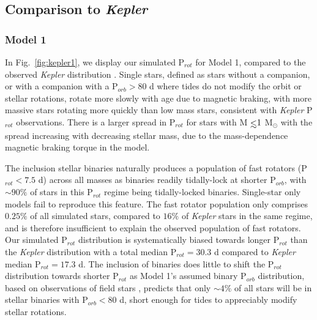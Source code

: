 \documentclass[twocolumn]{aastex61}
\def\lsim{~\rlap{$<$}{\lower 1.0ex\hbox{$\sim$}}}
\begin{document}
\subsection{Comparison to \textit{Kepler}}

\subsubsection{Model 1} \label{sec:results:kepler1}

In Fig.~\ref{fig:kepler1}, we display our simulated P$_{rot}$ for Model 1, compared to the observed \textit{Kepler} distribution \citep{McQuillan2014}. Single stars, defined as stars without a companion, or with a companion with a P$_{orb} > 80$ d where tides do not modify the orbit or stellar rotations, rotate more slowly with age due to magnetic braking, with more massive stars rotating more quickly than low mass stars, consistent with \textit{Kepler} P$_{rot}$ observations.  There is a larger spread in P$_{rot}$ for stars with M$\lsim 1$ M$_{\odot}$ with the spread increasing with decreasing stellar mass, due to the mass-dependence magnetic braking torque in the \citet{Matt2015} model.

The inclusion stellar binaries naturally produces a population of fast rotators (P$_{rot} < 7.5$ d) across all masses as binaries readily tidally-lock at shorter P$_{orb}$, with ${\sim}90\%$ of stars in this P$_{rot}$ regime being tidally-locked binaries. Single-star only models fail to reproduce this feature.  The fast rotator population only comprises $0.25\%$ of all simulated stars, compared to $16\%$ of \textit{Kepler} stars in the same regime, and is therefore insufficient to explain the observed population of fast rotators. Our simulated P$_{rot}$ distribution is systematically biased towards longer P$_{rot}$ than the \textit{Kepler} distribution with a total median P$_{rot} = 30.3$ d compared to \textit{Kepler} median P$_{rot} = 17.3$ d. The inclusion of binaries does little to shift the P$_{rot}$ distribution towards shorter P$_{rot}$ as Model 1's assumed binary P$_{orb}$ distribution, based on observations of field stars \citep{Raghavan2010}, predicts that only ${\sim}4\%$ of all stars will be in stellar binaries with P$_{orb} < 80$ d, short enough for tides to appreciably modify stellar rotations. 
\end{document}
